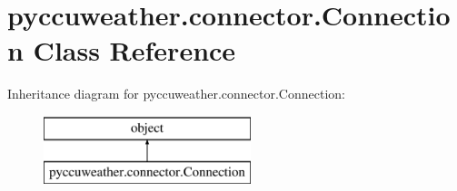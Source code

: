 \hypertarget{classpyccuweather_1_1connector_1_1_connection}{}\section{pyccuweather.\+connector.\+Connection Class Reference}
\label{classpyccuweather_1_1connector_1_1_connection}
Inheritance diagram for pyccuweather.\+connector.\+Connection\+:\begin{figure}[H]
\begin{center}
\leavevmode
\includegraphics[height=2.000000cm]{classpyccuweather_1_1connector_1_1_connection}
\end{center}
\end{figure}
